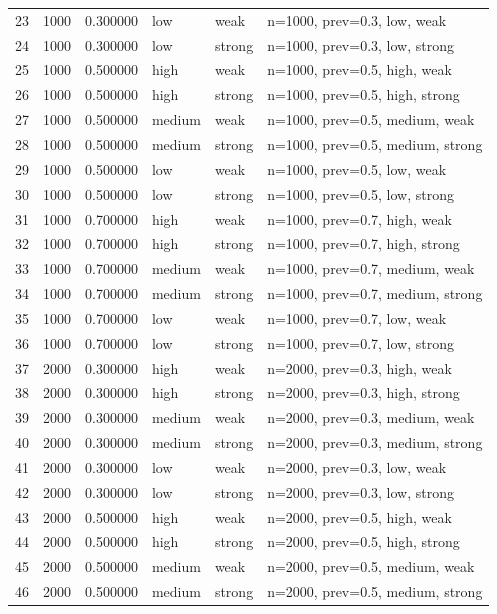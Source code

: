 \begin{tabular}{rrrlll}
23 & 1000 & 0.300000 & low & weak & n=1000, prev=0.3, low, weak \\
24 & 1000 & 0.300000 & low & strong & n=1000, prev=0.3, low, strong \\
25 & 1000 & 0.500000 & high & weak & n=1000, prev=0.5, high, weak \\
26 & 1000 & 0.500000 & high & strong & n=1000, prev=0.5, high, strong \\
27 & 1000 & 0.500000 & medium & weak & n=1000, prev=0.5, medium, weak \\
28 & 1000 & 0.500000 & medium & strong & n=1000, prev=0.5, medium, strong \\
29 & 1000 & 0.500000 & low & weak & n=1000, prev=0.5, low, weak \\
30 & 1000 & 0.500000 & low & strong & n=1000, prev=0.5, low, strong \\
31 & 1000 & 0.700000 & high & weak & n=1000, prev=0.7, high, weak \\
32 & 1000 & 0.700000 & high & strong & n=1000, prev=0.7, high, strong \\
33 & 1000 & 0.700000 & medium & weak & n=1000, prev=0.7, medium, weak \\
34 & 1000 & 0.700000 & medium & strong & n=1000, prev=0.7, medium, strong \\
35 & 1000 & 0.700000 & low & weak & n=1000, prev=0.7, low, weak \\
36 & 1000 & 0.700000 & low & strong & n=1000, prev=0.7, low, strong \\
37 & 2000 & 0.300000 & high & weak & n=2000, prev=0.3, high, weak \\
38 & 2000 & 0.300000 & high & strong & n=2000, prev=0.3, high, strong \\
39 & 2000 & 0.300000 & medium & weak & n=2000, prev=0.3, medium, weak \\
40 & 2000 & 0.300000 & medium & strong & n=2000, prev=0.3, medium, strong \\
41 & 2000 & 0.300000 & low & weak & n=2000, prev=0.3, low, weak \\
42 & 2000 & 0.300000 & low & strong & n=2000, prev=0.3, low, strong \\
43 & 2000 & 0.500000 & high & weak & n=2000, prev=0.5, high, weak \\
44 & 2000 & 0.500000 & high & strong & n=2000, prev=0.5, high, strong \\
45 & 2000 & 0.500000 & medium & weak & n=2000, prev=0.5, medium, weak \\
46 & 2000 & 0.500000 & medium & strong & n=2000, prev=0.5, medium, strong \\

\end{tabular}
